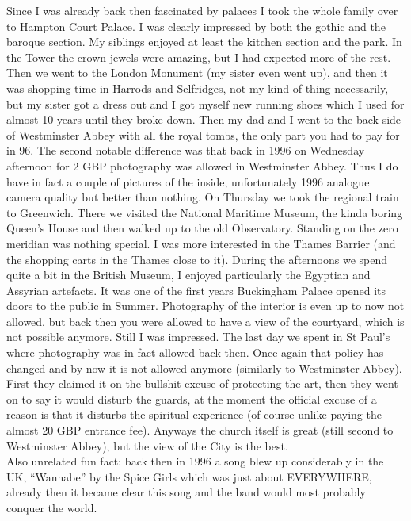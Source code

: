 Since I was already back then fascinated by palaces I took the whole family over to Hampton Court Palace. I was clearly impressed by both the gothic and the baroque section. My siblings enjoyed at least the kitchen section and the park. In the Tower the crown jewels were amazing, but I had expected more of the rest. Then we went to the London Monument (my sister even went up), and then it was shopping time in Harrods and Selfridges, not my kind of thing necessarily, but my sister got a dress out and I got myself new running shoes which I used for almost 10 years until they broke down. Then my dad and I went to the back side of Westminster Abbey with all the royal tombs, the only part you had to pay for in 96. The second notable difference was that back in 1996 on Wednesday afternoon for 2 GBP photography was allowed in Westminster Abbey. Thus I do have in fact a couple of pictures of the inside, unfortunately 1996 analogue camera quality but better than nothing. On Thursday we took the regional train to Greenwich. There we visited the National Maritime Museum, the kinda boring Queen's House and then walked up to the old Observatory. Standing on the zero meridian was nothing special. I was more interested in the Thames Barrier (and the shopping carts in the Thames close to it). During the afternoons we spend quite a bit in the British Museum, I enjoyed particularly the Egyptian and Assyrian artefacts. It was one of the first years Buckingham Palace opened its doors to the public in Summer. Photography of the interior is even up to now not allowed. but back then you were allowed to have a view of the courtyard, which is not possible anymore. Still I was impressed. The last day we spent in St Paul's where photography was in fact allowed back then. Once again that policy has changed and by now it is not allowed anymore (similarly to Westminster Abbey). First they claimed it on the bullshit excuse of protecting the art, then they went on to say it would disturb the guards, at the moment the official excuse of a reason is that it disturbs the spiritual experience (of course unlike paying the almost 20 GBP entrance fee). Anyways the church itself is great (still second to Westminster Abbey), but the view of the City is the best.\\
Also unrelated fun fact: back then in 1996 a song blew up considerably in the UK, ``Wannabe'' by the Spice Girls which was just about EVERYWHERE, already then it became clear this song and the band would most probably conquer the world.\\

